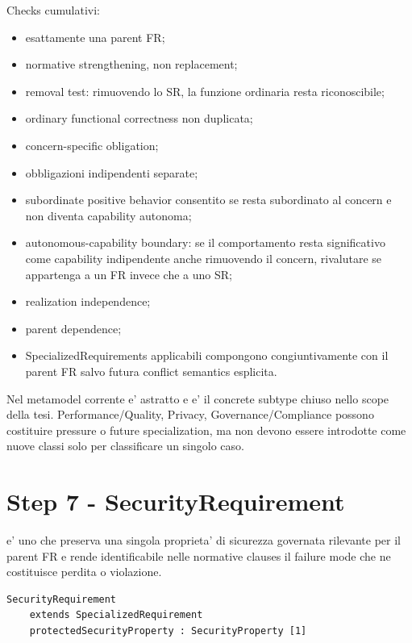 \documentclass[11pt,a4paper]{article}
\begin{document}
Checks cumulativi:
\begin{itemize}
  \item esattamente una parent FR;
  \item normative strengthening, non replacement;
  \item removal test: rimuovendo lo SR, la funzione ordinaria resta riconoscibile;
  \item ordinary functional correctness non duplicata;
  \item concern-specific obligation;
  \item obbligazioni indipendenti separate;
  \item subordinate positive behavior consentito se resta subordinato al concern e non diventa capability autonoma;
  \item autonomous-capability boundary: se il comportamento resta significativo come capability indipendente anche rimuovendo il concern, rivalutare se appartenga a un FR invece che a uno SR;
  \item realization independence;
  \item parent dependence;
  \item SpecializedRequirements applicabili compongono congiuntivamente con il parent FR salvo futura conflict semantics esplicita.
\end{itemize}

\begin{ddtaopen}[title={Concrete non-security specializations}]
Nel metamodel corrente \SR{} e' astratto e \SECR{} e' il concrete subtype chiuso nello scope della tesi. Performance/Quality, Privacy, Governance/Compliance possono costituire pressure o future specialization, ma non devono essere introdotte come nuove classi solo per classificare un singolo caso.
\end{ddtaopen}

\section{Step 7 - SecurityRequirement}
\closedtag

\SECR{} e' uno \SR{} che preserva una singola proprieta' di sicurezza governata rilevante per il parent FR e rende identificabile nelle normative clauses il failure mode che ne costituisce perdita o violazione.

\begin{lstlisting}
SecurityRequirement
    extends SpecializedRequirement
    protectedSecurityProperty : SecurityProperty [1]
\end{lstlisting}
\end{document}

